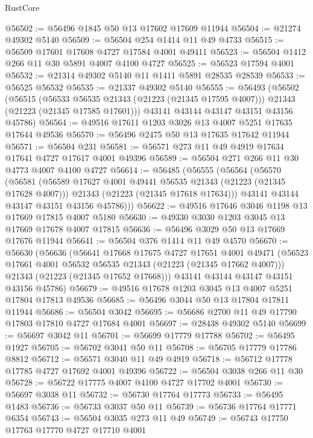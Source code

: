 \begin{lexlean}{RustCore}
\begin{coremodule}
@56502 := @56496 @1845 @50 @13 @17602 @17609 @11944
@56504 := @21274 @49302 @5140
@56509 := @56504 @254 @1414 @11 @49 @4733
@56515 := @56509 @17601 @17608 @4727 @17584 @4001 @49411
@56523 := @56504 @1412 @266 @11 @30 @5891 @4007 @4100 @4727
@56525 := @56523 @17594 @4001
@56532 := @21314 @49302 @5140 @11 @1411 @5891 @28535 @28539
@56533 := @56525 @56532
@56535 := @21337 @49302 @5140
@56555 := @56493
    (@56502
      (@56515
        (@56533 @56535 @21343 (@21223 (@21345 @17595 @4007)))
        @21343
        (@21223 (@21345 @17585 @17601)))
      @43141
      @43144
      @43147
      @43151
      @43156
      @45786)
@56564 := @49516 @17611 @1203 @3026 @13 @4007 @5251 @17635 @17644 @49536
@56570 := @56496 @2475 @50 @13 @17635 @17642 @11944
@56571 := @56504 @231
@56581 := @56571 @273 @11 @49 @4919 @17634 @17641 @4727 @17617 @4001 @49396
@56589 := @56504 @271 @266 @11 @30 @4773 @4007 @4100 @4727
@56614 := @56485
    (@56555
      (@56564
        (@56570
          (@56581
            (@56589 @17627 @4001 @49441 @56535 @21343 (@21223 (@21345 @17628 @4007)))
            @21343
            (@21223 (@21345 @17618 @17634)))
          @43141
          @43144
          @43147
          @43151
          @43156
          @45786)))
@56622 := @49516 @17646 @3046 @1198 @13 @17669 @17815 @4007 @5180
@56630 := @49330 @3030 @1203 @3045 @13 @17669 @17678 @4007 @17815
@56636 := @56496 @3029 @50 @13 @17669 @17676 @11944
@56641 := @56504 @376 @1414 @11 @49 @4570
@56670 := @56630
    (@56636
      (@56641
        @17668
        @17675
        @4727
        @17651
        @4001
        @49471
        (@56523 @17661 @4001 @56532 @56535 @21343 (@21223 (@21345 @17662 @4007)))
        @21343
        (@21223 (@21345 @17652 @17668)))
      @43141
      @43144
      @43147
      @43151
      @43156
      @45786)
@56679 := @49516 @17678 @1203 @3045 @13 @4007 @5251 @17804 @17813 @49536
@56685 := @56496 @3044 @50 @13 @17804 @17811 @11944
@56686 := @56504 @3042
@56695 := @56686 @2700 @11 @49 @17790 @17803 @17810 @4727 @17684 @4001
@56697 := @28438 @49302 @5140
@56699 := @56697 @3042 @11
@56701 := @56699 @17779 @17788
@56702 := @56495 @1927
@56705 := @56702 @3041 @50 @11
@56708 := @56705 @17779 @17786 @8812
@56712 := @56571 @3040 @11 @49 @4919
@56718 := @56712 @17778 @17785 @4727 @17692 @4001 @49396
@56722 := @56504 @3038 @266 @11 @30
@56728 := @56722 @17775 @4007 @4100 @4727 @17702 @4001
@56730 := @56697 @3038 @11
@56732 := @56730 @17764 @17773
@56733 := @56495 @1483
@56736 := @56733 @3037 @50 @11
@56739 := @56736 @17764 @17771 @6354
@56743 := @56504 @3035 @273 @11 @49
@56749 := @56743 @17750 @17763 @17770 @4727 @17710 @4001

\end{coremodule}
\end{lexlean}
